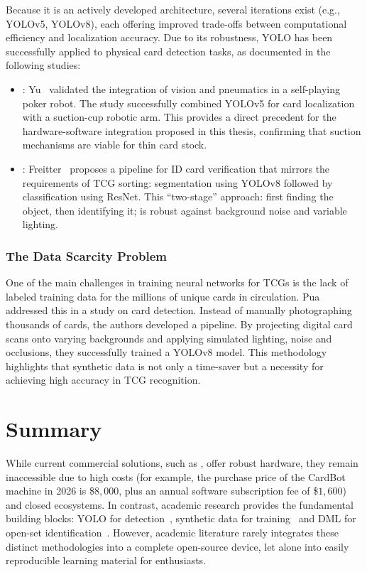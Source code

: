 Because it is an actively developed architecture, several iterations exist (e.g., \ac{YOLO}v5, \ac{YOLO}v8), each offering improved trade-offs between computational efficiency and localization accuracy. Due to its robustness, \ac{YOLO} has been successfully applied to physical card detection tasks, as documented in the following studies:
\begin{itemize}\label{yolo-studies}
    \item {}: Yu~\cite{yu2023pokerrobot} validated the integration of vision and pneumatics in a self-playing poker robot. The study successfully combined \ac{YOLO}v5 for card localization with a suction-cup robotic arm. This provides a direct precedent for the hardware-software integration proposed in this thesis, confirming that suction mechanisms are viable for thin card stock.
    \item {}: Freitter~\cite{freitter2025idcard} proposes a pipeline for ID card verification that mirrors the requirements of \ac{TCG} sorting: segmentation using \ac{YOLO}v8 followed by classification using \ac{ResNet}. This \enquote{two-stage} approach: first finding the object, then identifying it; is robust against background noise and variable lighting.
\end{itemize}

\subsubsection{The Data Scarcity Problem}\label{sec:scarcity}
One of the main challenges in training neural networks for \acp{TCG} is the lack of labeled training data for the millions of unique cards in circulation. Pua~\cite{pua2024pokemon} addressed this in a study on  card detection. Instead of manually photographing thousands of cards, the authors developed a  pipeline. By projecting digital card scans onto varying backgrounds and applying simulated lighting, noise and occlusions, they successfully trained a \ac{YOLO}v8 model. This methodology highlights that synthetic data is not only a time-saver but a necessity for achieving high accuracy in \ac{TCG} recognition.

\section{Summary}
While current commercial solutions, such as , offer robust hardware, they remain inaccessible due to high costs (for example, the purchase price of the CardBot machine in 2026 is \$$8,000$, plus an annual software subscription fee of \$$1,600$) and closed ecosystems. In contrast, academic research provides the fundamental building blocks: \ac{YOLO} for detection~\cite{yu2023pokerrobot, redmon2016yolo}, synthetic data for training~\cite{pua2024pokemon} and \ac{DML} for open-set identification~\cite{rosebrock2021lowhur}. However, academic literature rarely integrates these distinct methodologies into a complete open-source device, let alone into easily reproducible learning material for enthusiasts.

